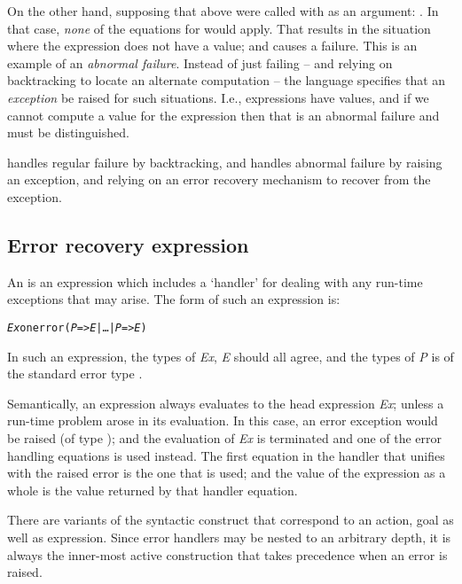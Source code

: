 On the other hand, supposing that  above were called with  as an argument: . In that case, \emph{none} of the equations for  would apply. That results in the situation where the  expression does not have a value; and causes a failure. This is an example of an \emph{abnormal failure}. Instead of just failing -- and relying on backtracking to locate an alternate computation -- the \go language specifies that an \emph{exception} be raised for such situations. I.e., expressions have values, and if we cannot compute a value for the expression then that is an abnormal failure and must be distinguished.

\go handles regular failure by backtracking, and handles abnormal failure by raising an exception, and relying on an error recovery mechanism to recover from the exception.

\subsection{Error recovery expression}
\label{expression:errorrecovery}

An  is an expression which includes a `handler' for dealing with any run-time exceptions that may arise. The form of such an expression is:
\begin{alltt}
\emph{Ex} onerror (\emph{P} => \emph{E} | \ldots{} | \emph{P\subn} => \emph{E\subn})
\end{alltt}
In such an expression, the types of \emph{Ex}, \emph{E\subi} should all agree, and the types of \emph{P\subi} is of the standard error type .

Semantically, an  expression always evaluates to the head expression \emph{Ex}; unless a run-time problem arose in its evaluation. In this case, an error exception would be raised (of type ); and the evaluation of \emph{Ex} is terminated and one of the error handling equations is used instead. The first equation in the handler that unifies with the raised error is the one that is used; and the value of the expression as a whole is the value returned by that handler equation.

There are variants of the  syntactic construct that correspond to an action, goal as well as expression.  Since error handlers may be nested to an arbitrary depth, it is always the inner-most active  construction that takes precedence when an error is raised.

